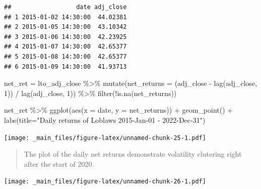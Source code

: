 \documentclass[
  oneside]{book}
\newenvironment{Shaded}{\begin{snugshade}}{\end{snugshade}}
\newcommand{\AttributeTok}[1]{\textcolor[rgb]{0.77,0.63,0.00}{#1}}
\newcommand{\DecValTok}[1]{\textcolor[rgb]{0.00,0.00,0.81}{#1}}
\newcommand{\FunctionTok}[1]{\textcolor[rgb]{0.00,0.00,0.00}{#1}}
\newcommand{\NormalTok}[1]{#1}
\newcommand{\OtherTok}[1]{\textcolor[rgb]{0.56,0.35,0.01}{#1}}
\newcommand{\SpecialCharTok}[1]{\textcolor[rgb]{0.00,0.00,0.00}{#1}}
\newcommand{\StringTok}[1]{\textcolor[rgb]{0.31,0.60,0.02}{#1}}
\begin{document}
\begin{verbatim}
##                  date adj_close
## 1 2015-01-02 14:30:00  44.02381
## 2 2015-01-05 14:30:00  43.10342
## 3 2015-01-06 14:30:00  42.23925
## 4 2015-01-07 14:30:00  42.65377
## 5 2015-01-08 14:30:00  42.65377
## 6 2015-01-09 14:30:00  41.93713
\end{verbatim}

\begin{Shaded}
\begin{Highlighting}[]
\NormalTok{net\_ret }\OtherTok{=}\NormalTok{ lto\_adj\_close }\SpecialCharTok{\%\textgreater{}\%}
  \FunctionTok{mutate}\NormalTok{(}\AttributeTok{net\_returns =} 
\NormalTok{           (adj\_close }\SpecialCharTok{{-}} \FunctionTok{lag}\NormalTok{(adj\_close, }\DecValTok{1}\NormalTok{)) }\SpecialCharTok{/} \FunctionTok{lag}\NormalTok{(adj\_close, }\DecValTok{1}\NormalTok{)) }\SpecialCharTok{\%\textgreater{}\%}
  \FunctionTok{filter}\NormalTok{(}\SpecialCharTok{!}\FunctionTok{is.na}\NormalTok{(net\_returns))}
\end{Highlighting}
\end{Shaded}

\begin{Shaded}
\begin{Highlighting}[]
\NormalTok{net\_ret }\SpecialCharTok{\%\textgreater{}\%} \FunctionTok{ggplot}\NormalTok{(}\FunctionTok{aes}\NormalTok{(}\AttributeTok{x =}\NormalTok{ date, }\AttributeTok{y =}\NormalTok{ net\_returns)) }\SpecialCharTok{+}
  \FunctionTok{geom\_point}\NormalTok{() }\SpecialCharTok{+}
  \FunctionTok{labs}\NormalTok{(}\AttributeTok{title=}\StringTok{"Daily returns of Loblaws 2015{-}Jan{-}01 {-} 2022{-}Dec{-}31"}\NormalTok{)}
\end{Highlighting}
\end{Shaded}

\texttt{[image: \_main\_files/figure-latex/unnamed-chunk-25-1.pdf]}

\begin{quote}
The plot of the daily net returns demonstrate volatility clutering right after the start of 2020.
\end{quote}

\begin{Shaded}
\end{Shaded}

\texttt{[image: \_main\_files/figure-latex/unnamed-chunk-26-1.pdf]}
\end{document}

